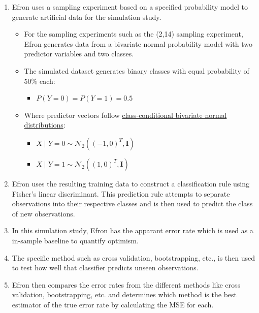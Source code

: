 \documentclass[
  letterpaper,
  DIV=11,
  numbers=noendperiod]{scrreprt}
\providecommand{\tightlist}{%
  \setlength{\itemsep}{0pt}\setlength{\parskip}{0pt}}
\begin{document}
\begin{enumerate}
\def\labelenumi{\arabic{enumi}.}
\tightlist
\item
  Efron uses a sampling experiment based on a specified probability
  model to generate artificial data for the simulation study.

  \begin{itemize}
  \tightlist
  \item
    For the sampling experiments such as the (2,14) sampling experiment,
    Efron generates data from a bivariate normal probability model with
    two predictor variables and two classes.
  \item
    The simulated dataset generates binary classes with equal
    probability of 50\% each:

    \begin{itemize}
    \tightlist
    \item
      \(P(Y = 0) = P(Y = 1) = 0.5\)
    \end{itemize}
  \item
    Where predictor vectors follow
    \href{bivariate_norm_dist.qmd}{class-conditional bivariate normal
    distributions}:

    \begin{itemize}
    \tightlist
    \item
      \(X \mid Y=0 \sim \mathcal{N}_2((-1,0)^T, \mathbf{I})\)
    \item
      \(X \mid Y=1 \sim \mathcal{N}_2((1,0)^T, \mathbf{I})\)
    \end{itemize}
  \end{itemize}
\item
  Efron uses the resulting training data to construct a classification
  rule using Fisher's linear discriminant. This prediction rule attempts
  to separate observations into their respective classes and is then
  used to predict the class of new observations.
\item
  In this simulation study, Efron has the apparant error rate which is
  used as a in-sample baseline to quantify optimism.
\item
  The specific method such as cross validation, bootstrapping, etc., is
  then used to test how well that classifier predicts unseen
  observations.
\item
  Efron then compares the error rates from the different methods like
  cross validation, bootstrapping, etc. and determines which method is
  the best estimator of the true error rate by calculating the MSE for
  each.


\end{enumerate}
\end{document}
